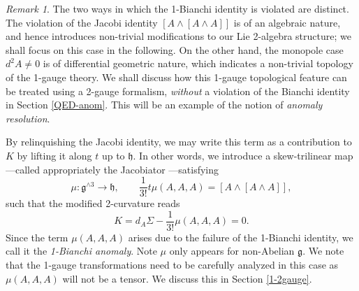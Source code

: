 \documentclass[onecolumn]{article}
\theoremstyle{theorem}
\theoremstyle{remark}
\newtheorem{remark}{Remark}[section]
\theoremstyle{example}
\theoremstyle{definition}
\numberwithin{equation}{section}
\def\g{\mathfrak g}
\begin{document}
\begin{remark}
The two ways in which the 1-Bianchi identity is violated are distinct. The violation of the Jacobi identity $[A\wedge [A\wedge A]]$ is of an algebraic nature, and hence introduces non-trivial modifications to our Lie 2-algebra structure; we shall focus on this case in the following. On the other hand, the monopole case $d^2A\neq 0$ is of  differential geometric  nature, which indicates a non-trivial topology of the 1-gauge theory. We shall discuss how this 1-gauge  topological feature can  be treated using a 2-gauge formalism, \textit{without} a violation of the Bianchi identity in Section \ref{QED-anom}. This will be an example of the notion of \textit{anomaly resolution}. 
\end{remark}






By relinquishing the Jacobi identity, we may write this term as a contribution to $K$ by lifting it along $t$ up to $\mathfrak{h}$. In other words, we introduce a skew-trilinear map---called appropriately the { {Jacobiator}%
}---satisfying
\begin{equation}
    \mu:\mathfrak{g}^{\wedge 3}\rightarrow\mathfrak{h},\qquad \frac{1}{3!}t\mu(A,A,A)=[A\wedge [A\wedge A]],\label{weakmu}
\end{equation}
such that the { {modified 2-curvature}} reads \cite{Kim:2019owc}
\begin{equation}
    K = d_A\Sigma - \frac{1}{3!}\mu(A,A,A) = 0.\label{eq:1biananom}
\end{equation}
{Since} the term $\mu(A,A,A)$ arises due to the failure of the 1-Bianchi identity, we call it the {\it {1-Bianchi anomaly}}. Note $\mu$ only appears for non-Abelian $\mathfrak{g}$. We note that the 1-gauge transformations need to be carefully analyzed in this case as $\mu(A,A,A)$ will not be a tensor. We discuss this in Section \ref{1-2gauge}.
\end{document}
